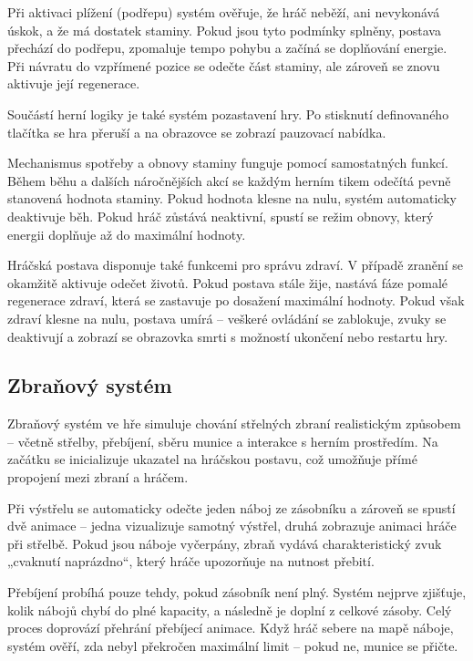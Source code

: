Při aktivaci plížení (podřepu) systém ověřuje, že hráč neběží, ani nevykonává úskok, a že má dostatek staminy. Pokud jsou tyto podmínky splněny, postava přechází do podřepu, zpomaluje tempo pohybu a začíná se doplňování energie. Při návratu do vzpřímené pozice se odečte část staminy, ale zároveň se znovu aktivuje její regenerace.

Součástí herní logiky je také systém pozastavení hry. Po stisknutí definovaného tlačítka se hra přeruší a na obrazovce se zobrazí pauzovací nabídka.

Mechanismus spotřeby a obnovy staminy funguje pomocí samostatných funkcí. Během běhu a dalších náročnějších akcí se každým herním tikem odečítá pevně stanovená hodnota staminy. Pokud hodnota klesne na nulu, systém automaticky deaktivuje běh. Pokud hráč zůstává neaktivní, spustí se režim obnovy, který energii doplňuje až do maximální hodnoty.

Hráčská postava disponuje také funkcemi pro správu zdraví. V případě zranění se okamžitě aktivuje odečet životů. Pokud postava stále žije, nastává fáze pomalé regenerace zdraví, která se zastavuje po dosažení maximální hodnoty. Pokud však zdraví klesne na nulu, postava umírá – veškeré ovládání se zablokuje, zvuky se deaktivují a zobrazí se obrazovka smrti s možností ukončení nebo restartu hry.

\newpage

\subsection{Zbraňový systém}
Zbraňový systém ve hře simuluje chování střelných zbraní realistickým způsobem – včetně střelby, přebíjení, sběru munice a interakce s herním prostředím. Na začátku se inicializuje ukazatel na hráčskou postavu, což umožňuje přímé propojení mezi zbraní a hráčem.

Při výstřelu se automaticky odečte jeden náboj ze zásobníku a zároveň se spustí dvě animace – jedna vizualizuje samotný výstřel, druhá zobrazuje animaci hráče při střelbě. Pokud jsou náboje vyčerpány, zbraň vydává charakteristický zvuk „cvaknutí naprázdno“, který hráče upozorňuje na nutnost přebití.

Přebíjení probíhá pouze tehdy, pokud zásobník není plný. Systém nejprve zjišťuje, kolik nábojů chybí do plné kapacity, a následně je doplní z celkové zásoby. Celý proces doprovází přehrání přebíjecí animace. Když hráč sebere na mapě náboje, systém ověří, zda nebyl překročen maximální limit – pokud ne, munice se přičte.

